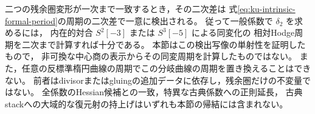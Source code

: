 \begin{remark}[二次差の一般計算に残る入力]
\label{rem:ku-intrinsic-period-gap}
二つの残余圏変形が一次まで一致するとき，その二次差は
式\eqref{eq:ku-intrinsic-formal-period}の周期の二次差で一意に検出される。
従って一般係数で $\delta_2$ を求めるには，
内在的対合 $S^2[-3]$ または $S^3[-5]$ による同変化の
相対Hodge周期を二次まで計算すれば十分である。
本節はこの検出写像の単射性を証明したもので，
非可換な中心商の表示からその同変周期を計算したものではない。
また，任意の反標準楕円曲線の周期でこの分岐曲線の周期を置き換えることはできない。
前者はdivisorまたはgluingの追加データに依存し，残余圏だけの不変量ではない。
全係数のHessian候補との一致，特異な古典係数への正則延長，
古典stackへの大域的な復元射の持上げはいずれも本節の帰結には含まれない。
\end{remark}
